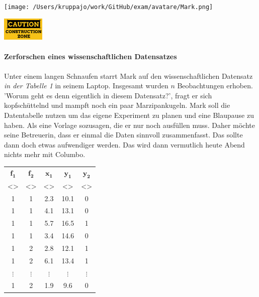 \documentclass[a4paper, 9pt]{scrartcl}\usepackage[]{graphicx}\usepackage[]{xcolor}
\begin{document}
 
\ifcollection
\begin{flushright}
\tiny\vspace{-3Ex}
\textbf{\examinhaltstart}
\exammodulebiostat
\vspace{-4Ex}
\end{flushright}
\begin{minipage}[t]{0.5\textwidth}
\texttt{[image: /Users/kruppajo/work/GitHub/exam/avatare/Mark.png]}
\end{minipage}
\begin{minipage}[t]{0.5\textwidth}
\hfill
\href{https://youtu.be/C9skfFRTHhI}{\includegraphics[width = 2cm]{img/caution}}
\end{minipage}
\fi



\ifcollection
\paragraph{Zerforschen eines wissenschaftlichen Datensatzes}
\fi

Unter einem langen Schnaufen starrt Mark auf den wissenschaftlichen Datensatz \textit{in der Tabelle 1} in seinem Laptop. Insgesamt wurden $n$ Beobachtungen erhoben. 'Worum geht es denn eigentlich in diesem Datensatz?', fragt er sich kopfschüttelnd und mampft noch ein paar Marzipankugeln. Mark soll die Datentabelle nutzen um das eigene Experiment zu planen und eine Blaupause zu haben. Als eine Vorlage sozusagen, die er nur noch ausfüllen muss. Daher möchte seine Betreuerin, dass er einmal die Daten sinnvoll zusammenfasst. Das sollte dann doch etwas aufwendiger werden. Das wird dann vermutlich heute Abend nichts mehr mit Columbo.

\begin{table}[h]
\centering
\Large
  \begin{tabular}{ccccc}
  \toprule
   $\boldsymbol{f_1}$  & $\boldsymbol{f_2}$ & $\boldsymbol{x_1}$ & $\boldsymbol{y_1}$ & $\boldsymbol{y_2}$ \\[2pt]
     <\phantom{xxx}>  & <\phantom{xxx}> & <\phantom{xxx}> & <\phantom{xxx}> & <\phantom{xxx}> \\[2pt] 
  \midrule
  1  & 1 & 2.3 & 10.1 & 0 \\  
  1  & 1 & 4.1 & 13.1 & 0 \\ 
  1  & 1 & 5.7 & 16.5 & 1 \\ 
  1  & 1 & 3.4 & 14.6 & 0 \\
  1  & 2 & 2.8 & 12.1 & 1 \\
  1  & 2 & 6.1 & 13.4 & 1 \\
  $\vdots$  & $\vdots$ & $\vdots$ & $\vdots$ & $\vdots$\\
  1 & 2  & 1.9 & 9.6 &  0\\
  \bottomrule
  \end{tabular}
\end{table}
\end{document}
